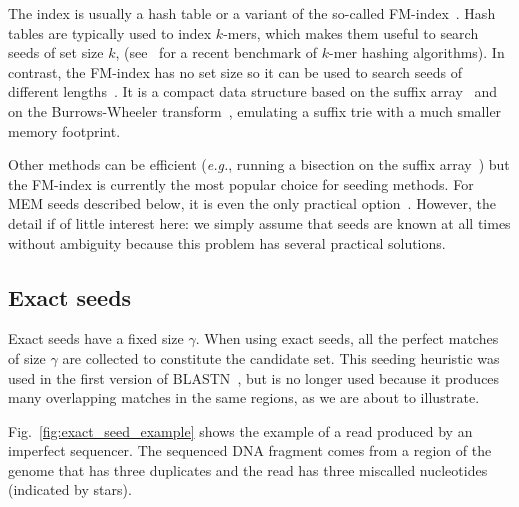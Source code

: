 \documentclass{article}
\begin{document}
The index is usually a hash table or a variant of the so-called
FM-index~\cite{pmid20460430}. Hash tables are typically used to index
$k$-mers, which makes them useful to search seeds of set size $k$,
(see~\cite{pmid30346548} for a recent benchmark of $k$-mer hashing
algorithms). In contrast, the FM-index has no set size so it can be used
to search seeds of different lengths~\cite{ferragina2000opportunistic,
ferragina2005indexing}. It is a compact data structure based on the suffix
array~\cite{manber1993suffix} and on the Burrows-Wheeler
transform~\cite{burrows1994block}, emulating a suffix trie with a much
smaller memory footprint.

Other methods can be efficient (\textit{e.g.}, running a bisection on the
suffix array~\cite{dobin2013star}) but the FM-index is currently the most
popular choice for seeding methods. For MEM seeds described below, it is
even the only practical option~\cite{pmid24336412, pmid25399029,
pmid23349213, pmid19389736}. However, the detail if of little interest
here: we simply assume that seeds are known at all times without ambiguity
because this problem has several practical solutions.


\subsection{Exact seeds}

Exact seeds have a fixed size $\gamma$. When using exact seeds, all the
perfect matches of size $\gamma$ are collected to constitute the candidate
set. This seeding heuristic was used in the first version of
BLASTN~\cite{pmid2231712}, but is no longer used because it produces many
overlapping matches in the same regions, as we are about to illustrate.

Fig.~\ref{fig:exact_seed_example} shows the example of a read produced
by an imperfect sequencer. The sequenced DNA fragment comes from a region
of the genome that has three duplicates and the read has three miscalled
nucleotides (indicated by stars).
\end{document}

